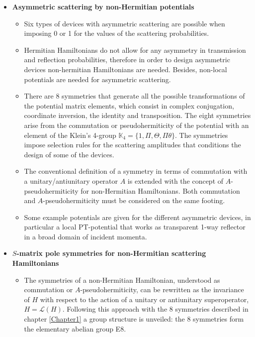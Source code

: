 \begin{itemize}
  \item {\bf Asymmetric scattering by non-Hermitian potentials}
  \begin{itemize}
    \item Six types of devices with asymmetric scattering are possible when imposing 0 or 1 for the values of the scattering probabilities.

    \item Hermitian Hamiltonians do not allow for any asymmetry in transmission and
    reflection probabilities, therefore in order to design asymmetric devices non-hermitian
    Hamiltonians are needed. Besides, non-local potentials are needed for asymmetric scattering.

    \item There are 8 symmetries that generate all the possible transformations of the potential matrix elements, which consist in complex conjugation, coordinate inversion, the identity and transposition. The eight symmetries arise from the commutation or pseudohermiticity of the potential with an element of the Klein’s 4-group $\mathbb{K}_4 = \{1,\Pi,\Theta,\Pi\theta\}$. The symmetries impose selection rules for the scattering amplitudes that conditions the design of some of the devices.

    \item The conventional definition of a symmetry in terms of commutation with a unitary/antiunitary operator $A$ is extended with the concept of $A$-pseudohermiticity for non-Hermitian Hamiltonians. Both commutation and $A$-pseudohermiticity must be considered on the same footing.

    \item Some example potentials are given for the different asymmetric devices, in particular a local PT-potential that works as transparent 1-way reflector in a broad domain of incident momenta.

  \end{itemize}

  \item {\bf $S$-matrix pole symmetries for non-Hermitian scattering Hamiltonians}
  \begin{itemize}
    \item The symmetries of a non-Hermitian Hamiltonian, understood as commutation or $A$-pseudohermiticity, can be rewritten as the invariance of $H$ with respect to the action of a unitary or antiunitary superoperator, $H = \mathcal{L}(H)$. Following this approach with the 8 symmetries described in chapter \ref{Chapter1} a group structure is unveiled: the 8 symmetries form the elementary abelian group E8.


\end{itemize}
\end{itemize}
